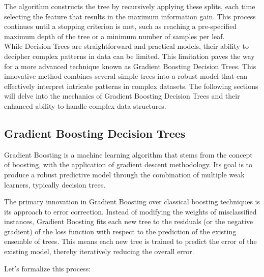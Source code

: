 The algorithm constructs the tree by recursively applying these splits, each time selecting the feature that results in the maximum information gain. This process continues until a stopping criterion is met, such as reaching a pre-specified maximum depth of the tree or a minimum number of samples per leaf.\\


While Decision Trees are straightforward and practical models, their ability to decipher complex patterns in data can be limited. This limitation paves the way for a more advanced technique known as Gradient Boosting Decision Trees. This innovative method combines several simple trees into a robust model that can effectively interpret intricate patterns in complex datasets. The following sections will delve into the mechanics of Gradient Boosting Decision Trees and their enhanced ability to handle complex data structures.

\subsection{Gradient Boosting Decision Trees}

Gradient Boosting is a machine learning algorithm that stems from the concept of boosting, with the application of gradient descent methodology. Its goal is to produce a robust predictive model through the combination of multiple weak learners, typically decision trees.

The primary innovation in Gradient Boosting over classical boosting techniques is its approach to error correction. Instead of modifying the weights of misclassified instances, Gradient Boosting fits each new tree to the residuals (or the negative gradient) of the loss function with respect to the prediction of the existing ensemble of trees. This means each new tree is trained to predict the error of the existing model, thereby iteratively reducing the overall error.

Let's formalize this process:

